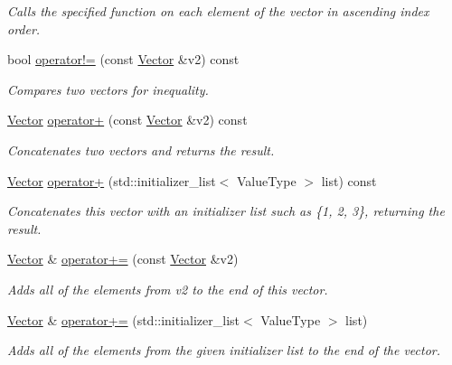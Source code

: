 \begin{DoxyCompactItemize}
\begin{DoxyCompactList}\small\item\em Calls the specified function on each element of the vector in ascending index order. \end{DoxyCompactList}\item 
bool \mbox{\hyperlink{classVector_a3e96c4b5c89d1b00f587b521874cd0d8}{operator!=}} (const \mbox{\hyperlink{classVector}{Vector}} \&v2) const
\begin{DoxyCompactList}\small\item\em Compares two vectors for inequality. \end{DoxyCompactList}\item 
\mbox{\hyperlink{classVector}{Vector}} \mbox{\hyperlink{classVector_acb70fcd67f846bf16b96223bcf43e476}{operator+}} (const \mbox{\hyperlink{classVector}{Vector}} \&v2) const
\begin{DoxyCompactList}\small\item\em Concatenates two vectors and returns the result. \end{DoxyCompactList}\item 
\mbox{\hyperlink{classVector}{Vector}} \mbox{\hyperlink{classVector_a2dce2988ba5880d744280b4bbf85b135}{operator+}} (std\+::initializer\+\_\+list$<$ Value\+Type $>$ list) const
\begin{DoxyCompactList}\small\item\em Concatenates this vector with an initializer list such as \{1, 2, 3\}, returning the result. \end{DoxyCompactList}\item 
\mbox{\hyperlink{classVector}{Vector}} \& \mbox{\hyperlink{classVector_a6b35f98e0e64a2fff6891a8806f640fd}{operator+=}} (const \mbox{\hyperlink{classVector}{Vector}} \&v2)
\begin{DoxyCompactList}\small\item\em Adds all of the elements from {\ttfamily v2} to the end of this vector. \end{DoxyCompactList}\item 
\mbox{\hyperlink{classVector}{Vector}} \& \mbox{\hyperlink{classVector_a22e55ed53bfa2da64ecd22b36757fcea}{operator+=}} (std\+::initializer\+\_\+list$<$ Value\+Type $>$ list)
\begin{DoxyCompactList}\small\item\em Adds all of the elements from the given initializer list to the end of the vector. \end{DoxyCompactList}\item 

\end{DoxyCompactItemize}
